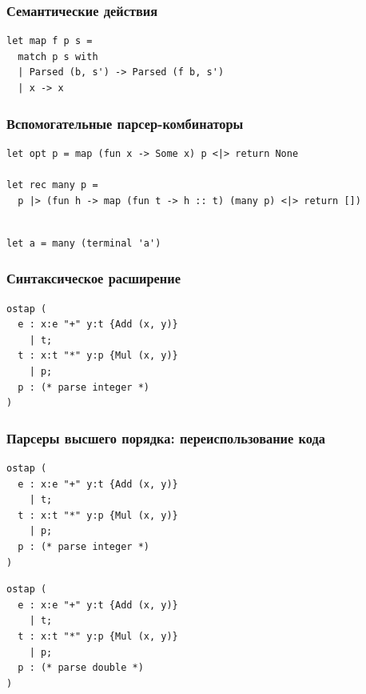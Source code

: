\documentclass{beamer}
\begin{document}
\begin{frame}[fragile]
  \transwipe[direction=90]
  \frametitle{Семантические действия}  
\begin{lstlisting}[frame=single]  
let map f p s = 
  match p s with
  | Parsed (b, s') -> Parsed (f b, s')
  | x -> x
\end{lstlisting}
\end{frame}

\begin{frame}[fragile]
  \transwipe[direction=90]
  \frametitle{Вспомогательные парсер-комбинаторы}  
\begin{lstlisting}[frame=single]  
let opt p = map (fun x -> Some x) p <|> return None
    
let rec many p =
  p |> (fun h -> map (fun t -> h :: t) (many p) <|> return [])
    
\end{lstlisting}

\begin{lstlisting}[frame=single]  
let a = many (terminal 'a')
\end{lstlisting}
\end{frame}

\begin{frame}[fragile]
  \transwipe[direction=90]
  \frametitle{Синтаксическое расширение}  
\begin{lstlisting}[frame=single]  
ostap (
  e : x:e "+" y:t {Add (x, y)} 
    | t; 
  t : x:t "*" y:p {Mul (x, y)} 
    | p;
  p : (* parse integer *)
)
\end{lstlisting}
\end{frame}

\begin{frame}[fragile]
  \transwipe[direction=90]
  \frametitle{Парсеры высшего порядка: переиспользование кода}  
\begin{lstlisting}[frame=single]  
ostap (
  e : x:e "+" y:t {Add (x, y)} 
    | t; 
  t : x:t "*" y:p {Mul (x, y)} 
    | p;
  p : (* parse integer *)
)
\end{lstlisting}
  
\begin{lstlisting}[frame=single]  
ostap (
  e : x:e "+" y:t {Add (x, y)} 
    | t; 
  t : x:t "*" y:p {Mul (x, y)} 
    | p;
  p : (* parse double *)
)
\end{lstlisting}	  
  
\end{frame}
\end{document}

